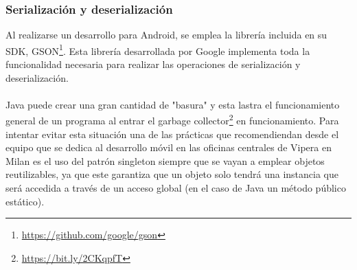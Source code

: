 \documentclass[a4paper, 12pt]{article}
\begin{document}
\subsubsection{Serialización y deserialización}
\label{sec-4-1-2}
Al realizarse un desarrollo para Android, se emplea la librería incluida en su SDK, GSON\footnote{\url{https://github.com/google/gson}}. Esta librería desarrollada por Google implementa toda la funcionalidad necesaria para realizar
las operaciones de serialización y deserialización.
\\
\\
Java puede crear una gran cantidad de "basura" y esta lastra el funcionamiento general de un programa al entrar el garbage collector\footnote{\url{https://bit.ly/2CKqpfT}} en funcionamiento. Para intentar evitar esta situación una de las prácticas que recomendiendan desde el equipo
que se dedica al desarrollo móvil en las oficinas centrales de Vipera en Milan es el uso del patrón singleton siempre que se vayan a emplear objetos reutilizables, ya que este garantiza que un objeto
solo tendrá una instancia que será accedida a través de un acceso global\cite{Singleton} (en el caso de Java un método público estático).
\end{document}
